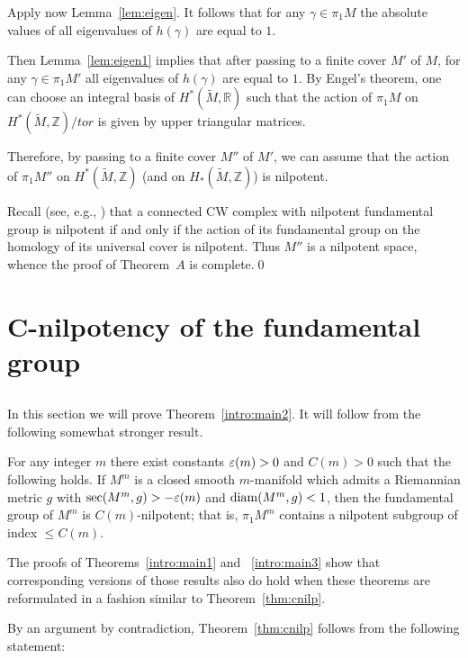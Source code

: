\documentclass{amsart}
\begin{document}
Apply now Lemma~\ref{lem:eigen}. It follows
that for any $\gamma\in \pi_1M$
the absolute values of all  eigenvalues of $h(\gamma)$ are equal to $1$.

Then Lemma~\ref{lem:eigen1}  implies that after passing to a finite
cover $M'$ of $M$,
for any $\gamma\in \pi_1M'$
all eigenvalues of $h(\gamma)$ are equal to $1$.
By Engel's theorem, one can choose an integral basis
of $H^*(\tilde M,\mathbb{R} )$
such that the action of $\pi_1M$
on $H^*(\tilde M, \mathbb{Z})/tor$ is given by upper triangular matrices.

Therefore, by passing to a finite cover $M''$ of $M'$,
we can assume that the action of $\pi_1M''$
on $H^*(\tilde M,\mathbb{Z} )$  (and  on $H_*(\tilde M,\mathbb{Z} )$)  is nilpotent.

Recall (see, e.g., \cite[2.19]{HMR})
that a connected CW complex with nilpotent fundamental group
is nilpotent if and only if the action of
its fundamental group on the homology of its universal cover is nilpotent.
Thus $M''$ is a nilpotent space, whence the proof of Theorem~$A$
is complete.\qed









\section{C-nilpotency of the fundamental group}\label{sec:c-nilp}

\subsection{}In this section we will prove Theorem~\ref{intro:main2}. It will follow
from the following somewhat stronger result.




\begin{thm}\label{thm:cnilp}
For any integer $m$ there exist constants $\varepsilon(m)>0$  and $C(m)>0$ such that
the following holds.
If
$M^m$ is a closed smooth $m$-manifold which admits
a Riemannian metric $g$ with
$\sec(M^m,g)> -\varepsilon(m)$ and $\operatorname{\rm diam}(M^m,g)< 1$,
then the fundamental group of $M^m$ is $C(m)$-nilpotent; 
that is,
$\pi_1M^m$ contains a nilpotent subgroup of index $\le C(m)$.
\end{thm}
\begin{rmk} %
The proofs of Theorems~\ref{intro:main1} and ~\ref{intro:main3} show
that
corresponding versions of those results
also do hold when these theorems are reformulated
in a fashion similar to Theorem~\ref{thm:cnilp}.
\end{rmk}
By an argument by contradiction,
Theorem~\ref{thm:cnilp} follows
from the following  statement:
\end{document}

